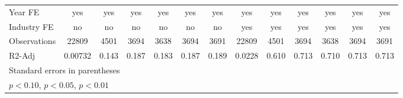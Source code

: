 {\begin{tabular}{l*{12}{c}}
\hline
Year FE             &         yes         &         yes         &         yes         &         yes         &         yes         &         yes         &         yes         &         yes         &         yes         &         yes         &         yes         &         yes         \\
Industry FE         &          no         &          no         &          no         &          no         &          no         &          no         &         yes         &         yes         &         yes         &         yes         &         yes         &         yes         \\
Observations        &       22809         &        4501         &        3694         &        3638         &        3694         &        3691         &       22809         &        4501         &        3694         &        3638         &        3694         &        3691         \\
R2-Adj              &     0.00732         &       0.143         &       0.187         &       0.183         &       0.187         &       0.189         &      0.0228         &       0.610         &       0.713         &       0.710         &       0.713         &       0.713         \\
\hline\hline
\multicolumn{13}{l}{\footnotesize Standard errors in parentheses}\\
\multicolumn{13}{l}{\footnotesize \sym{*} \(p<0.10\), \sym{**} \(p<0.05\), \sym{***} \(p<0.01\)}\\
\end{tabular}
}
